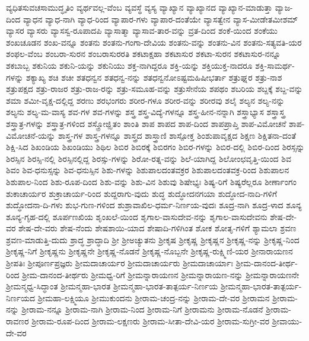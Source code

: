 {ವ್ಯಧಿತಸುವಚಸಾಮುದ್ಧೃತಿಂ
ವ್ಯರ್ಥವಲ್ಲ-ವೆಂಬ
ವ್ಯವಸ್ಥೆ
ವ್ಯಸ್ಯ
ವ್ಯಾಖ್ಯಾನ
ವ್ಯಾಖ್ಯಾನದ
ವ್ಯಾಖ್ಯಾನ-ಮಾಡುತ್ತಾ
ವ್ಯಾಜ-ದಿಂದ
ವ್ಯಾಧನ
ವ್ಯಾಧ-ನಾಗಿ
ವ್ಯಾಧ-ರಿಂದ
ವ್ಯಾಪಾರ-ಗಳು
ವ್ಯಾಪಾರ-ದಂತೆಯೇ
ವ್ಯಾಸತ್ವೇನ
ವ್ಯಾಸ-ಮೀಡೇತಮೀಶಮ್
ವ್ಯಾಸರ
ವ್ಯಾಸರು
ವ್ಯಾಸಸ್ವ-ರೂಪಾದಪಿ
ವ್ಯಾಸಾತ್ಮಾ
ವ್ಯಾಸಾವ-ತಾರ-ವನ್ನು
ವ್ರತ-ದಿಂದ
ಶಂಕೆ-ಯಿಂದ
ಶಂಕೆಯು
ಶಂಖಚೂಡನ
ಶಂಖ-ವನ್ನೂ
ಶಂತನು
ಶಂತನು-ಗಂಗಾ-ದೇವಿಯ
ಶಂತನು-ವನ್ನು
ಶಂತನು-ವಿನ
ಶಂತನು-ಸತ್ಯವತಿ-ಯರ
ಶಂಫಲ-ವೆಂಬ
ಶಂಬರಾ-ಸುರನ
ಶಂಬರಾಸುರರತಿ
ಶಕಟಾಕ್ಷಹಾ
ಶಕಟಾಸುರ
ಶಕಟಾ-ಸುರನ
ಶಕಟಾಸುರ-ನನ್ನೂ
ಶಕಬಾಬ್ಬ
ಶಕುನಿಯ
ಶಕುನಿ-ಯನ್ನು
ಶಕುನಿಯು
ಶಕ್ತ-ನಾಗಿದ್ದರೂ
ಶಕ್ತಿ-ಯನ್ನು
ಶಕ್ತಿಯುಕ್ತ-ನಾದರೂ
ಶಕ್ತಿ-ಸಾಮರ್ಥ-ಗಳನ್ನು
ಶಕ್ಯಾಖ್ಯ
ಶಚಿ
ಶಚೀ
ಶತಧನ್ವನ
ಶತಧನ್ವ-ನನ್ನು
ಶತಧನ್ವನೋಽಷ್ಟಮಹಿಷೀಭರ್ತಾ
ಶತ್ರುಘ್ನರ
ಶತ್ರು-ನಾಶ
ಶತ್ರುಪಕ್ಷದ
ಶತ್ರು-ರಾಜರ
ಶತ್ರು-ರಾಜ-ರನ್ನು
ಶತ್ರು-ಸಮೂಹ-ವನ್ನು
ಶತ್ರುಸೇನೆಯ
ಶಪಥಂ
ಶಬರಿಯ
ಶಬ್ದಕ್ಕೆ
ಶಬ್ದ-ವನ್ನು
ಶಮಾ
ಶಮೀ-ವೃಕ್ಷ-ದಲ್ಲಿದ್ದ
ಶರಣು
ಶರಭಂಗರು
ಶರೀರ-ಗಳೂ
ಶರೀರ-ವನ್ನು
ಶರೀರವು
ಶಲೈ
ಶಲ್ಯನ
ಶಲ್ಯ-ನನ್ನು
ಶಲ್ಯನು
ಶಲ್ಯ-ಮ-ವಾಸ್ಯ
ಶವ-ಗಳ
ಶವ-ಗಳನ್ನು
ಶಸ್ತ್ರ
ಶಸ್ತ್ರ-ವಿದ್ಯೆ-ಗಳನ್ನೂ
ಶಸ್ತ್ರ-ಹೀನ-ನನ್ನಾಗಿ
ಶಸ್ತ್ರಾಭ್ಯಾಸ
ಶಸ್ತ್ರಾಸ್ತ್ರ
ಶಸ್ತ್ರಾತ್ರ-ಗಳನ್ನು
ಶಸ್ತ್ರಾತ್ರ-ಗಳಿಂದ
ಶಸ್ತ್ರೋಜ್ಝಿತಂ
ಶಾಂತಿ
ಶಾಪ
ಶಾಪದ
ಶಾಪ-ದಿಂದ
ಶಾಪಪ್ರಾಪ್ತಿ
ಶಾಪ-ವಿಮೋಚನೆ
ಶಾಪ-ವಿಮೋಚನೆ-ಯನ್ನು
ಶಾಸ್ತ್ರ-ಗಳ
ಶಾಸ್ತ್ರ-ಗಳನ್ನೂ
ಶಾಸ್ತ್ರದ
ಶಾಸ್ತ್ರಾಣಿ
ಶಾಸ್ಪೋಕ್ತ
ಶಿಂಶುಪಾವೃಕ್ಷದ
ಶಿಕ್ಷಣ
ಶಿಕ್ಷಿತನಾ-ದಂತೆ
ಶಿಕ್ಷಿ-ಸಿದ
ಶಿಖಂಡಿಯ
ಶಿಖಂಡಿಯು
ಶಿಥಿಲ
ಶಿಬಿರ
ಶಿಬಿರಕ್ಕೆ
ಶಿಬಿರಗಂ
ಶಿಬಿರ-ಗಳನ್ನು
ಶಿಬಿರ-ದಲ್ಲಿ
ಶಿಬಿರ-ದಿಂದ
ಶಿರಸ್ಸನ್ನು
ಶಿರಸ್ಸಿನ
ಶಿರಸ್ಸಿ-ನಲ್ಲಿ
ಶಿರಸ್ಸಿನಲ್ಲಿದ್ದ
ಶಿರಸ್ಸು-ಗಳನ್ನು
ಶಿರೋ-ರತ್ನ-ವನ್ನು
ಶಿಲೆ-ಯಾಗಿದ್ದ
ಶಿಲೋಂಛವೃತ್ತಿ-ಯಿಂದ
ಶಿವ
ಶಿವಂ
ಶಿವ-ಧನುಸ್ಸನ್ನು
ಶಿವ-ಧನುಸ್ಸಿನ
ಶಿಶು-ಗಳನ್ನು
ಶಿಶುಪಾಲದಂತವಕ್ರರ
ಶಿಶುಪಾಲದಂತವಕ್ರ-ರಿಂದ
ಶಿಶುಪಾಲನ
ಶಿಶುಪಾಲ-ನಿಂದ
ಶಿಶು-ರೂಪ-ದಿಂದ
ಶಿಶು-ವನ್ನು
ಶಿಶು-ವಿನ
ಶಿಶುವು
ಶಿಷೇಭ್ಯಃ
ಶಿಷ್ಯ-ರಿಗೆ
ಶಿಷ್ಯರೆಲ್ಲರೂ
ಶೀರ್ಣಾಂಗಂ
ಶುಕಾಚಾರ್ಯರ
ಶುಕ್ರಾಚಾರ್ಯ-ರಿಂದ
ಶುದ್ದರಾಗು-ವುದು
ಶುದ್ಧ
ಶುದ್ಧೋದನಗಯಾ
ಶುದ್ಧೋದ-ನಾದಿ-ಗಳಿಗೆ
ಶುದ್ಧೋದನಾ-ದಿ-ಗಳು
ಶುಭ-ಗುಣ-ಗಳಿಂದ
ಶುಶ್ರಾವಾಖಿಲ-ಧರ್ಮ-ನಿರ್ಣಯ-ವುದಃ
ಶೂದ್ರ-ನಾಗಿ
ಶೂದ್ರ-ಳಾದ
ಶೂನ್ಯ
ಶೂನ್ಯ-ಗೃಹ-ದಲ್ಲಿ
ಶೂರ್ಪಣಖಿಯ
ಶೃಂಖಲೆ-ಯಿಂದ
ಶೃಗಾಲ-ವಾಸುದೇವ-ನನ್ನು
ಶೃಗಾಲ-ವಾಸುದೇವನು
ಶೇಷ-ದೇ-ವರ
ಶೇಷ-ದೇ-ವರು
ಶೇಷ-ನೆಂದು
ಶೇಷಶಾಯಿ-ಯಾದ
ಶೇಷಾದಿ-ಗಳಿಗಿಂತ
ಶೋಕ
ಶೋತೃ-ಗಳಿಗೆ
ಶ್ಯಾಮಲಾ
ಶ್ರವಣ
ಶ್ರವಣ-ಮಾಡುತ್ತಿ-ದುದು
ಶ್ರಾದ್ಧ
ಶ್ರಾದ್ಧಾದಿ
ಶ್ರೀ
ಶ್ರೀಅಚ್ಯುತನು
ಶ್ರೀಕೃಷ
ಶ್ರೀಕೃಷ್ಣ
ಶ್ರೀಕೃಷ್ಣನ
ಶ್ರೀಕೃಷ್ಣ-ನನ್ನು
ಶ್ರೀಕೃಷ್ಣ-ನಿಂದ
ಶ್ರೀಕೃಷ್ಣ-ನಿಗೆ
ಶ್ರೀಕೃಷ್ಣನು
ಶ್ರೀಕೃಷ್ಣನೇ
ಶ್ರೀಕೃಷ್ಣ-ನೊಡನೆ
ಶ್ರೀಕೃಷ್ಣ-ನೊಬ್ಬನೇ
ಶ್ರೀಕೃಷ್ಣ-ರುಕ್ಷ್ಮಿಣಿ-ಯರ
ಶ್ರೀನಾರಾಯಣನ
ಶ್ರೀಪತಿಃ
ಶ್ರೀಪೂರ್ಣಪ್ರಜ್ಞರು
ಶ್ರೀಮದಾಚಾರ್ಯರ
ಶ್ರೀಮದಾಚಾರ್ಯರು
ಶ್ರೀಮದಾಚಾರ್ಯಾಃ
ಶ್ರೀಮ-ದಾನಂದ-ತೀರ್ಥ-ರಿಂದ
ಶ್ರೀಮ-ದಾನಂದ-ತೀರ್ಥರು
ಶ್ರೀಮಧ್ವ-ರಿಗೆ
ಶ್ರೀಮನ್ನಾರಾಯಣನ
ಶ್ರೀಮನ್ನಾರಾಯಣ-ನನ್ನು
ಶ್ರೀಮನ್ನಾರಾಯಣನೇ
ಶ್ರೀಮನ್ಮಧ್ವ-ಸಿದ್ಧಾಂತ
ಶ್ರೀಮನ್ಮಹಾ-ಭಾರತ
ಶ್ರೀಮನ್ಮಹಾ-ಭಾರತ-ತಾತ್ಪರ್ಯ-ನಿರ್ಣಯ
ಶ್ರೀಮನ್ಮಹಾ-ಭಾರತ-ತಾತ್ಪರ್ಯ-ನಿರ್ಣಯದ
ಶ್ರೀಮಹಾ-ಲಕ್ಷ್ಮಿಯೂ
ಶ್ರೀಮುಕುಂದನು
ಶ್ರೀರಾಮ-ಚಂದ್ರ-ನನ್ನು
ಶ್ರೀರಾಮ-ದೇ-ವರ
ಶ್ರೀರಾಮನ
ಶ್ರೀರಾಮ-ನನ್ನು
ಶ್ರೀರಾಮ-ನನ್ನೂ
ಶ್ರೀರಾಮ-ನಾಗಿ
ಶ್ರೀರಾಮ-ನಿಂದ
ಶ್ರೀರಾಮ-ನಿಗೆ
ಶ್ರೀರಾಮನು
ಶ್ರೀರಾಮ-ನೊಡನೆ
ಶ್ರೀರಾಮ-ರಾವಣರ
ಶ್ರೀರಾಮ-ರೂಪ-ದಿಂದ
ಶ್ರೀರಾಮ-ಲಕ್ಷಣರು
ಶ್ರೀರಾಮ-ಸೀತಾ-ದೇವಿ-ಯರ
ಶ್ರೀರಾಮ-ಸುಗ್ರೀ-ವರ
ಶ್ರೀವಾಯು-ದೇ-ವರ
}

